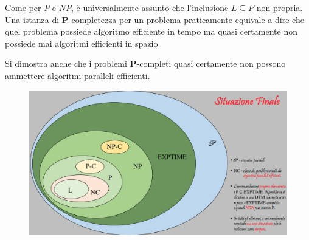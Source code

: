 Come per $P$ e $NP$, è universalmente assunto che l'inclusione $L \subseteq P$ non propria. Una istanza di $\mathbf{P}$-completezza per un problema praticamente equivale a dire che quel problema possiede algoritmo efficiente in tempo ma quasi certamente non possiede mai algoritmi efficienti in spazio

Si dimostra anche che i problemi $\mathbf{P}$-completi quasi certamente non possono ammettere algoritmi paralleli efficienti. \vspace{5cm}

\begin{figure}[H]
  \centering
  \includegraphics[width=1\textwidth]{img/finale.png}
\end{figure}


